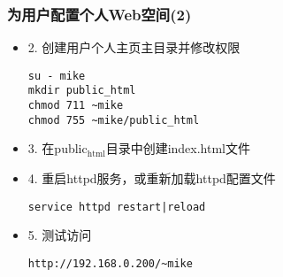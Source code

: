 \documentclass[xcolor=svgnames,presentation]{beamer}
\begin{document}
\begin{frame}[fragile]
\frametitle{为用户配置个人Web空间(2)}
\label{sec-1-16}
\begin{itemize}

\item 2. 创建用户个人主页主目录并修改权限\\
\label{sec-1-16-1}%
\begin{verbatim}
su - mike
mkdir public_html
chmod 711 ~mike
chmod 755 ~mike/public_html
\end{verbatim}

\item 3. 在public$_{\mathrm{html}}$目录中创建index.html文件
\label{sec-1-16-2}%

\item 4. 重启httpd服务，或重新加载httpd配置文件\\
\label{sec-1-16-3}%
\begin{verbatim}
service httpd restart|reload
\end{verbatim}

\item 5. 测试访问\\
\label{sec-1-16-4}%
\begin{verbatim}
http://192.168.0.200/~mike
\end{verbatim}
\end{itemize} %
\end{frame}
\end{document}
